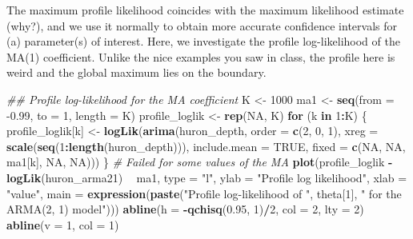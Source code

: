 \documentclass[]{book}
\newenvironment{Shaded}{\begin{snugshade}}{\end{snugshade}}
\newcommand{\CommentTok}[1]{\textcolor[rgb]{0.56,0.35,0.01}{\textit{#1}}}
\newcommand{\ControlFlowTok}[1]{\textcolor[rgb]{0.13,0.29,0.53}{\textbf{#1}}}
\newcommand{\DataTypeTok}[1]{\textcolor[rgb]{0.13,0.29,0.53}{#1}}
\newcommand{\DecValTok}[1]{\textcolor[rgb]{0.00,0.00,0.81}{#1}}
\newcommand{\FloatTok}[1]{\textcolor[rgb]{0.00,0.00,0.81}{#1}}
\newcommand{\KeywordTok}[1]{\textcolor[rgb]{0.13,0.29,0.53}{\textbf{#1}}}
\newcommand{\NormalTok}[1]{#1}
\newcommand{\OperatorTok}[1]{\textcolor[rgb]{0.81,0.36,0.00}{\textbf{#1}}}
\newcommand{\OtherTok}[1]{\textcolor[rgb]{0.56,0.35,0.01}{#1}}
\newcommand{\StringTok}[1]{\textcolor[rgb]{0.31,0.60,0.02}{#1}}
\begin{document}
The maximum profile likelihood coincides with the maximum likelihood
estimate (why?), and we use it normally to obtain more accurate
confidence intervals for (a) parameter(s) of interest. Here, we
investigate the profile log-likelihood of the MA(1) coefficient. Unlike
the nice examples you saw in class, the profile here is weird and the
global maximum lies on the boundary.

\begin{Shaded}
\begin{Highlighting}[]
\CommentTok{## Profile log-likelihood for the MA coefficient}
\NormalTok{K <-}\StringTok{ }\DecValTok{1000}
\NormalTok{ma1 <-}\StringTok{ }\KeywordTok{seq}\NormalTok{(}\DataTypeTok{from =} \FloatTok{-0.99}\NormalTok{, }\DataTypeTok{to =} \DecValTok{1}\NormalTok{, }\DataTypeTok{length =}\NormalTok{ K)}
\NormalTok{profile_loglik <-}\StringTok{ }\KeywordTok{rep}\NormalTok{(}\OtherTok{NA}\NormalTok{, K)}
\ControlFlowTok{for}\NormalTok{ (k }\ControlFlowTok{in} \DecValTok{1}\OperatorTok{:}\NormalTok{K) \{}
\NormalTok{    profile_loglik[k] <-}\StringTok{ }\KeywordTok{logLik}\NormalTok{(}\KeywordTok{arima}\NormalTok{(huron_depth, }\DataTypeTok{order =} \KeywordTok{c}\NormalTok{(}\DecValTok{2}\NormalTok{, }\DecValTok{0}\NormalTok{, }\DecValTok{1}\NormalTok{), }\DataTypeTok{xreg =} \KeywordTok{scale}\NormalTok{(}\KeywordTok{seq}\NormalTok{(}\DecValTok{1}\OperatorTok{:}\KeywordTok{length}\NormalTok{(huron_depth))), }
        \DataTypeTok{include.mean =} \OtherTok{TRUE}\NormalTok{, }\DataTypeTok{fixed =} \KeywordTok{c}\NormalTok{(}\OtherTok{NA}\NormalTok{, }\OtherTok{NA}\NormalTok{, ma1[k], }\OtherTok{NA}\NormalTok{, }\OtherTok{NA}\NormalTok{)))}
\NormalTok{\}}
\CommentTok{# Failed for some values of the MA}
\KeywordTok{plot}\NormalTok{(profile_loglik }\OperatorTok{-}\StringTok{ }\KeywordTok{logLik}\NormalTok{(huron_arma21) }\OperatorTok{~}\StringTok{ }\NormalTok{ma1, }\DataTypeTok{type =} \StringTok{"l"}\NormalTok{, }\DataTypeTok{ylab =} \StringTok{"Profile log likelihood"}\NormalTok{, }
    \DataTypeTok{xlab =} \StringTok{"value"}\NormalTok{, }\DataTypeTok{main =} \KeywordTok{expression}\NormalTok{(}\KeywordTok{paste}\NormalTok{(}\StringTok{"Profile log-likelihood of "}\NormalTok{, theta[}\DecValTok{1}\NormalTok{], }
        \StringTok{" for the ARMA(2, 1) model"}\NormalTok{)))}
\KeywordTok{abline}\NormalTok{(}\DataTypeTok{h =} \OperatorTok{-}\KeywordTok{qchisq}\NormalTok{(}\FloatTok{0.95}\NormalTok{, }\DecValTok{1}\NormalTok{)}\OperatorTok{/}\DecValTok{2}\NormalTok{, }\DataTypeTok{col =} \DecValTok{2}\NormalTok{, }\DataTypeTok{lty =} \DecValTok{2}\NormalTok{)}
\KeywordTok{abline}\NormalTok{(}\DataTypeTok{v =} \DecValTok{1}\NormalTok{, }\DataTypeTok{col =} \DecValTok{1}\NormalTok{)}
\end{Highlighting}
\end{Shaded}
\end{document}
